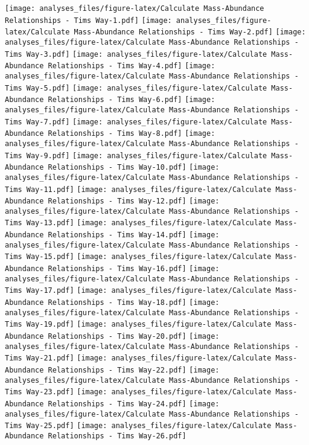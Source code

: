 \documentclass[]{article}
\begin{document}
\texttt{[image: analyses\_files/figure-latex/Calculate Mass-Abundance Relationships - Tims Way-1.pdf]}
\texttt{[image: analyses\_files/figure-latex/Calculate Mass-Abundance Relationships - Tims Way-2.pdf]}
\texttt{[image: analyses\_files/figure-latex/Calculate Mass-Abundance Relationships - Tims Way-3.pdf]}
\texttt{[image: analyses\_files/figure-latex/Calculate Mass-Abundance Relationships - Tims Way-4.pdf]}
\texttt{[image: analyses\_files/figure-latex/Calculate Mass-Abundance Relationships - Tims Way-5.pdf]}
\texttt{[image: analyses\_files/figure-latex/Calculate Mass-Abundance Relationships - Tims Way-6.pdf]}
\texttt{[image: analyses\_files/figure-latex/Calculate Mass-Abundance Relationships - Tims Way-7.pdf]}
\texttt{[image: analyses\_files/figure-latex/Calculate Mass-Abundance Relationships - Tims Way-8.pdf]}
\texttt{[image: analyses\_files/figure-latex/Calculate Mass-Abundance Relationships - Tims Way-9.pdf]}
\texttt{[image: analyses\_files/figure-latex/Calculate Mass-Abundance Relationships - Tims Way-10.pdf]}
\texttt{[image: analyses\_files/figure-latex/Calculate Mass-Abundance Relationships - Tims Way-11.pdf]}
\texttt{[image: analyses\_files/figure-latex/Calculate Mass-Abundance Relationships - Tims Way-12.pdf]}
\texttt{[image: analyses\_files/figure-latex/Calculate Mass-Abundance Relationships - Tims Way-13.pdf]}
\texttt{[image: analyses\_files/figure-latex/Calculate Mass-Abundance Relationships - Tims Way-14.pdf]}
\texttt{[image: analyses\_files/figure-latex/Calculate Mass-Abundance Relationships - Tims Way-15.pdf]}
\texttt{[image: analyses\_files/figure-latex/Calculate Mass-Abundance Relationships - Tims Way-16.pdf]}
\texttt{[image: analyses\_files/figure-latex/Calculate Mass-Abundance Relationships - Tims Way-17.pdf]}
\texttt{[image: analyses\_files/figure-latex/Calculate Mass-Abundance Relationships - Tims Way-18.pdf]}
\texttt{[image: analyses\_files/figure-latex/Calculate Mass-Abundance Relationships - Tims Way-19.pdf]}
\texttt{[image: analyses\_files/figure-latex/Calculate Mass-Abundance Relationships - Tims Way-20.pdf]}
\texttt{[image: analyses\_files/figure-latex/Calculate Mass-Abundance Relationships - Tims Way-21.pdf]}
\texttt{[image: analyses\_files/figure-latex/Calculate Mass-Abundance Relationships - Tims Way-22.pdf]}
\texttt{[image: analyses\_files/figure-latex/Calculate Mass-Abundance Relationships - Tims Way-23.pdf]}
\texttt{[image: analyses\_files/figure-latex/Calculate Mass-Abundance Relationships - Tims Way-24.pdf]}
\texttt{[image: analyses\_files/figure-latex/Calculate Mass-Abundance Relationships - Tims Way-25.pdf]}
\texttt{[image: analyses\_files/figure-latex/Calculate Mass-Abundance Relationships - Tims Way-26.pdf]}
\end{document}
